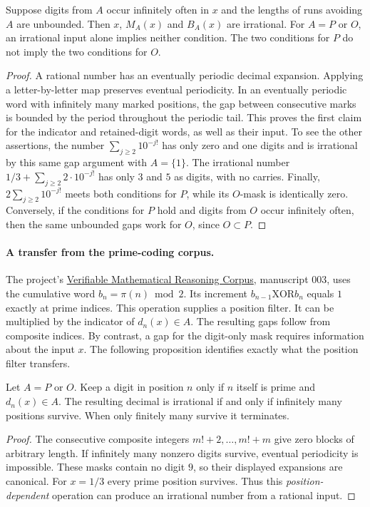 \documentclass[11pt,a4paper]{article}
\theoremstyle{definition}\newtheorem{definition}[theorem]{Definition}\newtheorem{example}[theorem]{Example}
\theoremstyle{remark}\newtheorem{remark}[theorem]{Remark}
\begin{document}
\begin{proposition}\label{prop:mask-gap}
Suppose digits from $A$ occur infinitely often in $x$ and the lengths of runs
avoiding $A$ are unbounded. Then $x$, $M_A(x)$ and $B_A(x)$ are irrational.
For $A=P$ or $O$, an irrational input alone implies neither condition.
The two conditions for $P$ do not imply the two conditions for $O$.
\end{proposition}
\begin{proof}
A rational number has an eventually periodic decimal expansion. Applying a
letter-by-letter map preserves eventual periodicity. In an eventually periodic
word with infinitely many marked positions, the gap between consecutive marks
is bounded by the period throughout the periodic tail. This proves the first
claim for the indicator and retained-digit words, as well as their input.
To see the other assertions, the number $\sum_{j\ge2}10^{-j!}$ has only
zero and one digits and is irrational by this same gap argument with $A=\{1\}$.
The irrational number $1/3+\sum_{j\ge2}2\cdot10^{-j!}$ has only $3$ and $5$
as digits, with no carries. Finally, $2\sum_{j\ge2}10^{-j!}$ meets both
conditions for $P$, while its $O$-mask is identically zero. Conversely, if the
conditions for $P$ hold and digits from $O$ occur infinitely often, then the
same unbounded gaps work for $O$, since $O\subset P$.
\end{proof}

\paragraph{A transfer from the prime-coding corpus.}
The project's \href{https://github.com/QEEDDD/Verifiable-Mathematical-Reasoning-Corpus/tree/38348353416f1f7fc50cecb93c3b554a00260c13}{Verifiable Mathematical Reasoning Corpus}, manuscript 003, uses the cumulative word $b_n=\pi(n)\bmod 2$. Its increment $b_{n-1}\mathbin{\mathrm{XOR}}b_n$ equals $1$ exactly at prime indices. This operation supplies a position filter. It can be multiplied by the indicator of $d_n(x)\in A$. The resulting gaps follow from composite indices. By contrast, a gap for the digit-only mask requires information about the input $x$. The following proposition identifies exactly what the position filter transfers.
\begin{proposition}\label{prop:prime-position}
Let $A=P$ or $O$. Keep a digit in position $n$ only if $n$ itself is prime
and $d_n(x)\in A$. The resulting decimal is irrational if and only if infinitely
many positions survive. When only finitely many survive it terminates.
\end{proposition}
\begin{proof}
The consecutive composite integers $m!+2,\ldots,m!+m$ give zero blocks of
arbitrary length. If infinitely many nonzero digits survive, eventual
periodicity is impossible. These masks contain no digit $9$, so their displayed
expansions are canonical. For $x=1/3$ every prime position survives. Thus this
\emph{position-dependent} operation can produce an irrational number from a
rational input.
\end{proof}
\end{document}
